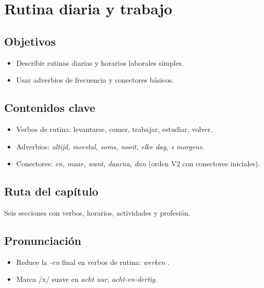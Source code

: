 \chapter{Rutina diaria y trabajo}
\section{Objetivos}
\begin{itemize}[leftmargin=*]
	\item Describir rutinas diarias y horarios laborales simples.
	\item Usar adverbios de frecuencia y conectores básicos.
\end{itemize}

\section{Contenidos clave}
\begin{itemize}[leftmargin=*]
	\item Verbos de rutina: levantarse, comer, trabajar, estudiar, volver.
	\item Adverbios: \textit{altijd, meestal, soms, nooit, elke dag, \textquotesingle{}s morgens}.
	\item Conectores: \textit{en, maar, want, daarna, dan} (orden V2 con conectores iniciales).
\end{itemize}

\section{Ruta del capítulo}
Seis secciones con verbos, horarios, actividades y profesión.








\section{Pronunciación}
\begin{itemize}[leftmargin=*]
	\item Reduce la \textit{-en} final en verbos de rutina: \textit{werken} .
	\item Marca /x/ suave en \textit{acht uur}, \textit{acht-en-dertig}.
\end{itemize}


